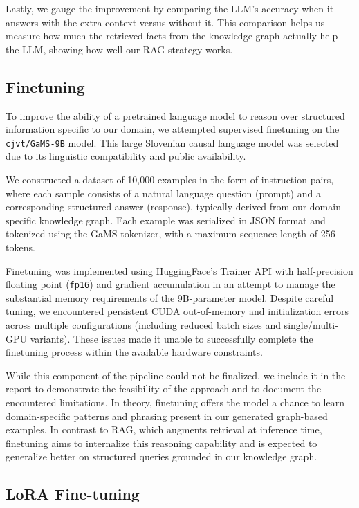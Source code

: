 \documentclass[fleqn,moreauthors,10pt]{ds_report}
\begin{document}
Lastly, we gauge the improvement by comparing the LLM's accuracy when it answers with the extra context versus without it. This comparison helps us measure how much the retrieved facts from the knowledge graph actually help the LLM, showing how well our RAG strategy works.

\subsection*{Finetuning}

To improve the ability of a pretrained language model to reason over structured information specific to our domain, we attempted supervised finetuning on the \texttt{cjvt/GaMS-9B} model. This large Slovenian causal language model was selected due to its linguistic compatibility and public availability.

We constructed a dataset of 10{,}000 examples in the form of instruction pairs, where each sample consists of a natural language question (prompt) and a corresponding structured answer (response), typically derived from our domain-specific knowledge graph. Each example was serialized in JSON format and tokenized using the GaMS tokenizer, with a maximum sequence length of 256 tokens.

Finetuning was implemented using HuggingFace’s Trainer API with half-precision floating point (\texttt{fp16}) and gradient accumulation in an attempt to manage the substantial memory requirements of the 9B-parameter model. Despite careful tuning, we encountered persistent CUDA out-of-memory and initialization errors across multiple configurations (including reduced batch sizes and single/multi-GPU variants). These issues made it unable to successfully complete the finetuning process within the available hardware constraints.

While this component of the pipeline could not be finalized, we include it in the report to demonstrate the feasibility of the approach and to document the encountered limitations. In theory, finetuning offers the model a chance to learn domain-specific patterns and phrasing present in our generated graph-based examples. In contrast to RAG, which augments retrieval at inference time, finetuning aims to internalize this reasoning capability and is expected to generalize better on structured queries grounded in our knowledge graph.

\subsection*{LoRA Fine-tuning}
\end{document}
